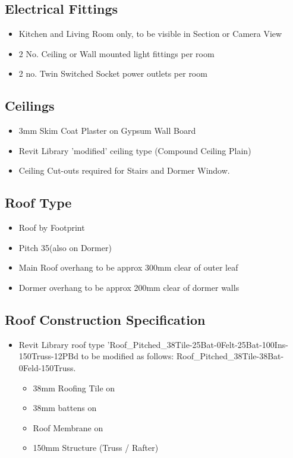 \subsection*{Electrical Fittings}
\begin{itemize}
	\item Kitchen and Living Room only, to be visible in Section or Camera View
	\item 2 No. Ceiling or Wall mounted light fittings per room
	\item 2 no. Twin Switched Socket power outlets per room
\end{itemize}





\subsection*{Ceilings}
\begin{itemize}
	\item 3mm Skim Coat Plaster on Gypsum Wall Board
	\item Revit Library 'modified' ceiling type (Compound Ceiling Plain)
	\item Ceiling Cut-outs required for Stairs and Dormer Window.
\end{itemize}



\subsection*{Roof Type}
\begin{itemize}
	\item Roof by Footprint
	\item Pitch 35\degree (also on Dormer)
	\item Main Roof overhang to be approx 300mm clear of outer leaf
	\item Dormer overhang to be approx 200mm clear of dormer walls
\end{itemize}



\subsection*{Roof Construction Specification}
\begin{itemize}
	\item Revit Library roof type 'Roof\_Pitched\_38Tile-25Bat-0Felt-25Bat-100Ins-150Truss-12PBd to be modified as follows: Roof\_Pitched\_38Tile-38Bat-0Feld-150Truss.
	\begin{itemize}
		\item 38mm Roofing Tile on 
		\item 38mm battens on 
		\item Roof Membrane on 
		\item 150mm Structure (Truss / Rafter)
	\end{itemize}
\end{itemize}




